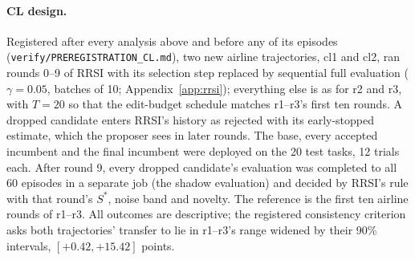 \documentclass[11pt]{article}
\begin{document}
\paragraph{CL design.} Registered after every analysis above and before any of its episodes (\texttt{verify/PREREGISTRATION\_CL.md}), two new airline trajectories, cl1 and cl2, ran rounds 0--9 of RRSI with its selection step replaced by sequential full evaluation ($\gamma=0.05$, batches of 10; Appendix~\ref{app:rrsi}); everything else is as for r2 and r3, with $T=20$ so that the edit-budget schedule matches r1--r3's first ten rounds. A dropped candidate enters RRSI's history as rejected with its early-stopped estimate, which the proposer sees in later rounds. The base, every accepted incumbent and the final incumbent were deployed on the 20 test tasks, 12 trials each. After round 9, every dropped candidate's evaluation was completed to all 60 episodes in a separate job (the shadow evaluation) and decided by RRSI's rule with that round's $S^*$, noise band and novelty. The reference is the first ten airline rounds of r1--r3. All outcomes are descriptive; the registered consistency criterion asks both trajectories' transfer to lie in r1--r3's range widened by their 90\% intervals, $[+0.42,+15.42]$ points.

\begin{table}[t]
\centering\small
\setlength{\tabcolsep}{3pt}
\caption{Loops on airline, rounds 0--9: r1--r3 driven by full evaluation, cl1 and cl2 by sequential full evaluation. Accepted changes (in parentheses, those inside the noise band), candidate-evaluation episodes (share of the planned episodes), the loop's dollar cost at list prices (Table~\ref{tab:loopcost}), and transfer at round 10: held-out success of the incumbent after round 9 minus the base, in points, with a 90\% task-bootstrap interval.}
\label{tab:cl}
\end{table}
\end{document}

